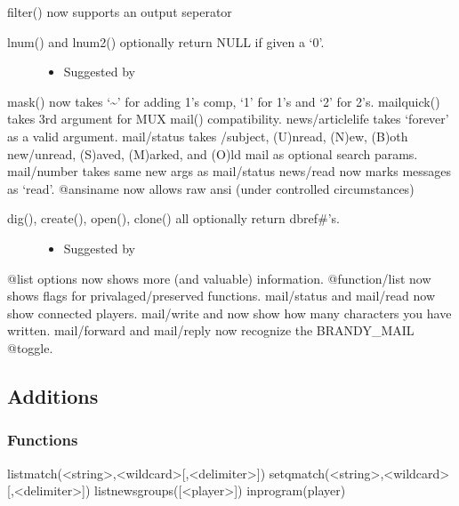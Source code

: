 \documentclass[letterpaper,10pt,english]{sphinxmanual}
\begin{document}
\sphinxAtStartPar
filter() now supports an output seperator
\begin{description}
\item[{lnum() and lnum2() optionally return NULL if given a ‘0’.}] \leavevmode\begin{itemize}
\item {} 
\sphinxAtStartPar
Suggested by 

\end{itemize}

\end{description}

\sphinxAtStartPar
mask() now takes ‘\textasciitilde{}’ for adding 1’s comp, ‘1’ for 1’s and ‘2’ for 2’s.
mailquick() takes 3rd argument for MUX mail() compatibility.
news/articlelife takes ‘forever’ as a valid argument.
mail/status takes /subject, (U)nread, (N)ew, (B)oth new/unread, (S)aved, (M)arked, and (O)ld mail as optional search params.
mail/number takes same new args as mail/status
news/read now marks messages as ‘read’.
@ansiname now allows raw ansi (under controlled circumstances)
\begin{description}
\item[{dig(), create(), open(), clone() all optionally return dbref\#’s.}] \leavevmode\begin{itemize}
\item {} 
\sphinxAtStartPar
Suggested by 

\end{itemize}

\end{description}

\sphinxAtStartPar
@list options now shows more (and valuable) information.
@function/list now shows flags for privalaged/preserved functions.
mail/status and mail/read now show connected players.
mail/write and \sphinxhyphen{} now show how many characters you have written.
mail/forward and mail/reply now recognize the BRANDY\_MAIL @toggle.


\subsection{Additions}
\label{\detokenize{changelog:id76}}

\subsubsection{Functions}
\label{\detokenize{changelog:id77}}
\sphinxAtStartPar
listmatch(\textless{}string\textgreater{},\textless{}wildcard\textgreater{}{[},\textless{}delimiter\textgreater{}{]})
setqmatch(\textless{}string\textgreater{},\textless{}wildcard\textgreater{}{[},\textless{}delimiter\textgreater{}{]})
listnewsgroups({[}\textless{}player\textgreater{}{]})
inprogram(player)
\end{document}
